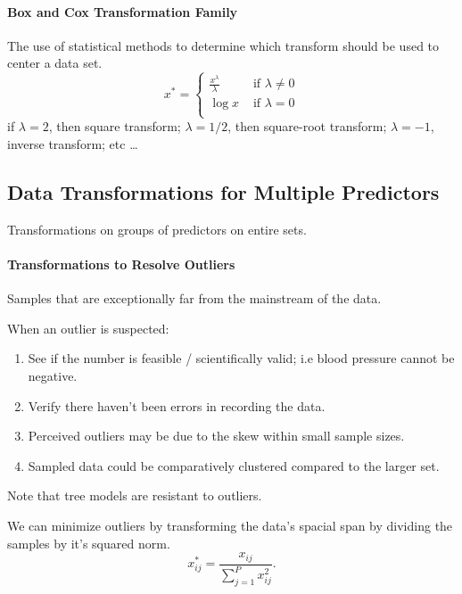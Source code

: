 \documentclass[../main.tex]{subfiles}
\begin{document}
    \paragraph{Box and Cox Transformation Family}
        The use of statistical methods to determine which transform should be used to center a data set.
    \[ x^{*} = \begin{cases}
    \frac{x^\lambda}{\lambda} & \text{ if } \lambda \not = 0 \\
    \log{x} & \text{ if } \lambda=0 \\
    \end{cases} \]
    if $ \lambda =2$, then square transform; $ \lambda =1/2$, then square-root transform; $ \lambda = -1$, inverse transform; etc \dots

\subsection{Data Transformations for Multiple Predictors}
    Transformations on groups of predictors on entire sets.

    \paragraph{Transformations to Resolve Outliers}
    
    \begin{definition}[Outliers]
        Samples that are exceptionally far from the mainstream of the data.
    \end{definition}
    When an outlier is suspected:
    \begin{enumerate}
        \item See if the number is feasible / scientifically valid; i.e blood pressure cannot be negative.
        \item Verify there haven't been errors in recording the data.
        \item Perceived outliers may be due to the skew within small sample sizes.
        \item Sampled data could be comparatively clustered compared to the larger set.
    \end{enumerate}
    
    \quad Note that tree models are resistant to outliers.

    We can minimize outliers by transforming the data's spacial span by dividing the samples by it's squared norm.
    \[ x^*_{ij} = \frac{x_{ij}}{\sum_{j=1}^{P}x^2_{ij}}.\]
\end{document}
